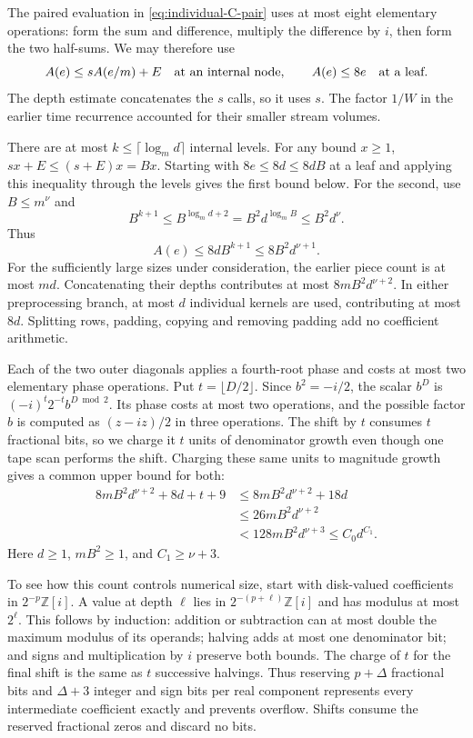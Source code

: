 \documentclass[11pt]{article}
\theoremstyle{definition}
\begin{document}
The paired evaluation in \eqref{eq:individual-C-pair} uses at most
eight elementary operations: form the sum and difference, multiply
the difference by \(i\), then form the two half-sums.  We may therefore use
\[
 A(e)\le sA(e/m)+E
 \quad\hbox{at an internal node},\qquad A(e)\le8e
 \quad\hbox{at a leaf}.
\]
The depth estimate concatenates the \(s\) calls, so it uses \(s\).
The factor \(1/W\) in the earlier time recurrence accounted for
their smaller stream volumes.

There are at most \(k\le\lceil\log_m d\rceil\) internal levels.
For any bound \(x\ge1\), \(sx+E\le(s+E)x=Bx\).
Starting with \(8e\le8d\le8dB\) at a leaf and applying this
inequality through the levels gives the first bound below.
For the second, use \(B\le m^\nu\) and
\[
 B^{k+1}\le B^{\log_m d+2}
          =B^2d^{\log_m B}\le B^2d^\nu.
\]
Thus
\[
 A(e)\le 8dB^{k+1}\le8B^2d^{\nu+1}.
\]
For the sufficiently large sizes under consideration, the earlier
piece count is at most \(md\).  Concatenating their depths contributes
at most \(8mB^2d^{\nu+2}\).  In either preprocessing branch, at most
\(d\) individual kernels are used, contributing at most \(8d\).
Splitting rows, padding, copying and removing padding add no
coefficient arithmetic.

Each of the two outer diagonals applies a fourth-root phase and costs
at most two elementary phase operations.  Put
\(t=\lfloor D/2\rfloor\).  Since \(b^2=-i/2\), the scalar \(b^D\)
is \((-i)^t2^{-t}b^{D\bmod2}\).  Its phase costs at most two
operations, and the possible factor \(b\) is computed as
\((z-iz)/2\) in three operations.  The shift by \(t\) consumes
\(t\) fractional bits, so we charge it \(t\) units of denominator
growth even though one tape scan performs the shift.  Charging these
same units to magnitude growth gives a common upper bound for both:
\[
\begin{aligned}
 8mB^2d^{\nu+2}+8d+t+9
 &\le 8mB^2d^{\nu+2}+18d\\
 &\le 26mB^2d^{\nu+2}\\
 &<128mB^2d^{\nu+3}\le C_0d^{C_1}.
\end{aligned}
\]
Here \(d\ge1\), \(mB^2\ge1\), and \(C_1\ge\nu+3\).

To see how this count controls numerical size, start with disk-valued
coefficients in \(2^{-p}\mathbb Z[i]\).  A value at depth \(\ell\)
lies in \(2^{-(p+\ell)}\mathbb Z[i]\) and has modulus at most
\(2^\ell\).  This follows by induction: addition or subtraction
can at most double the maximum modulus of its operands; halving adds
at most one denominator bit; and signs and multiplication by \(i\)
preserve both bounds.  The charge of \(t\) for the final shift is
the same as \(t\) successive halvings.  Thus reserving \(p+\Delta\)
fractional bits and \(\Delta+3\) integer and sign bits per real
component represents every intermediate coefficient exactly and
prevents overflow.  Shifts consume the reserved fractional zeros
and discard no bits.
\end{document}
